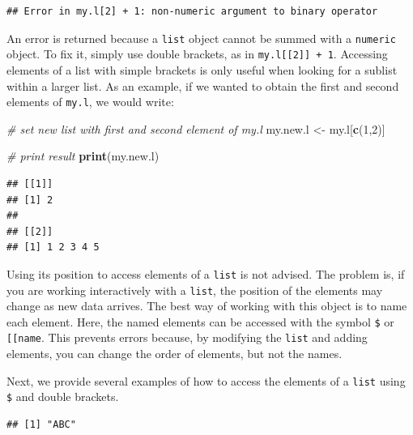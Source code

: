 \documentclass[11pt,]{book}
\newenvironment{Shaded}{\begin{snugshade}}{\end{snugshade}}
\newcommand{\KeywordTok}[1]{\textcolor[rgb]{0.27,0.27,0.27}{\textbf{#1}}}
\newcommand{\DecValTok}[1]{\textcolor[rgb]{0.06,0.06,0.06}{#1}}
\newcommand{\StringTok}[1]{\textcolor[rgb]{0.5,0.5,0.5}{#1}}
\newcommand{\CommentTok}[1]{\textcolor[rgb]{0.56,0.35,0.01}{\textit{#1}}}
\newcommand{\OperatorTok}[1]{\textcolor[rgb]{0.81,0.36,0.00}{\textbf{#1}}}
\newcommand{\NormalTok}[1]{#1}
\begin{document}
\begin{verbatim}
## Error in my.l[2] + 1: non-numeric argument to binary operator
\end{verbatim}

An error is returned because a \texttt{list} object cannot be summed
with a \texttt{numeric} object. To fix it, simply use double brackets,
as in \texttt{my.l{[}{[}2{]}{]}\ +\ 1}. Accessing elements of a list
with simple brackets is only useful when looking for a sublist within a
larger list. As an example, if we wanted to obtain the first and second
elements of \texttt{my.l}, we would write:

\begin{Shaded}
\begin{Highlighting}[]
\CommentTok{# set new list with first and second element of my.l}
\NormalTok{my.new.l <-}\StringTok{ }\NormalTok{my.l[}\KeywordTok{c}\NormalTok{(}\DecValTok{1}\NormalTok{,}\DecValTok{2}\NormalTok{)]}

\CommentTok{# print result}
\KeywordTok{print}\NormalTok{(my.new.l)}
\end{Highlighting}
\end{Shaded}

\begin{verbatim}
## [[1]]
## [1] 2
## 
## [[2]]
## [1] 1 2 3 4 5
\end{verbatim}

Using its position to access elements of a \texttt{list} is not advised.
The problem is, if you are working interactively with a \texttt{list},
the position of the elements may change as new data arrives. The best
way of working with this object is to name each element. Here, the named
elements can be accessed with the symbol \texttt{\$} or
\texttt{{[}{[}\textquotesingle{}name\textquotesingle{}{]}{]}}. This
prevents errors because, by modifying the \texttt{list} and adding
elements, you can change the order of elements, but not the names.

Next, we provide several examples of how to access the elements of a
\texttt{list} using \texttt{\$} and double brackets.

\begin{Shaded}
\end{Shaded}

\begin{verbatim}
## [1] "ABC"
\end{verbatim}
\end{document}
